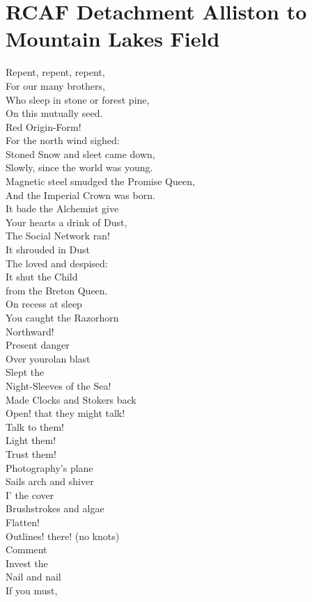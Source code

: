 \documentclass[smalldemyvopaper,11pt,twoside,onecolumn,openright,extrafontsizes]{memoir}
\begin{document}
\chapter{RCAF Detachment Alliston to Mountain Lakes Field}
Repent, repent, repent,
\\For our many brothers,
\\Who sleep in stone or forest pine,
\\On this mutually seed.
\\Red Origin-Form!
\\For the north wind sighed:
\\Stoned Snow and sleet came down,
\\Slowly, since the world was young.
\\Magnetic steel smudged the Promise Queen,
\\And the Imperial Crown was born.
\\It bade the Alchemist give
\\Your hearts a drink of Dust,
\\The Social Network ran!
\\It shrouded in Dust
\\The loved and despised:
\\It shut the Child
\\from the Breton Queen.
\\On recess at sleep
\\You caught the Razorhorn
\\Northward!
\\Present danger
\\Over yourolan blast
\\Slept the
\\Night-Sleeves of the Sea!
\\Made Clocks and Stokers back
\\Open! that they might talk!
\\Talk to them!
\\Light them!
\\Trust them!
\\Photography's plane
\\Sails arch and shiver
\\I' the cover
\\Brushstrokes and algae
\\Flatten!
\\Outlines! there! (no knots)
\\Comment
\\Invest the
\\Nail and nail
\\If you must,
\end{document}
